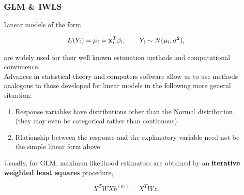\documentclass[compress,red]{beamer}
\begin{document}
\begin{frame}

\frametitle{GLM \& IWLS}
{\small
Linear models of the form 

	$$ E(Y_i) = \mu_i = \bold{x}_i^T \beta_i; \qquad Y_i \sim N(\mu_i,\sigma^2), $$

are widely used for their well known estimation methods and computational convinience.\\
\vspace{0.1cm}
Advances in statistical theory and computers software allow us to use methods analogous to those developed for linear models in the following more general situation: 

\begin{enumerate}
\item Response variables have distributions other than the Normal distribution (they may even be categorical rather than continuous). 
\item Rlationship between the response and the explanatory variable need not be the simple linear form above. 
\end{enumerate}
}

Usually, for GLM,  maximun likelihood estimators are obtained by an {\bf iterative weighted least squares} procedure, 

$$ X^TWXb^{(m)} = X^T W z. $$ 

\end{frame}
\end{document}
